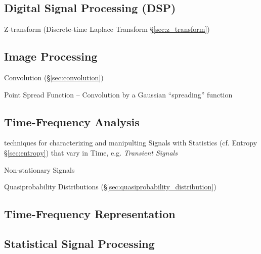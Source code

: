 \subsection{Digital Signal Processing (DSP)}\label{sec:dsp}

\fist Z-transform (Discrete-time Laplace Transform \S\ref{sec:z_transform})



\subsection{Image Processing}\label{sec:image_processing}

Convolution (\S\ref{sec:convolution})

Point Spread Function -- Convolution by a Gaussian ``spreading'' function



\subsection{Time-Frequency Analysis}\label{sec:time_frequency_analysis}

techniques for characterizing and manipulting Signals with Statistics (cf.
Entropy \S\ref{sec:entropy}) that vary in Time, e.g. \emph{Transient Signals}

Non-stationary Signals

\fist Quasiprobability Distributions
(\S\ref{sec:quasiprobability_distribution})



\subsection{Time-Frequency Representation}
\label{sec:time_frequency_representation}



\subsection{Statistical Signal Processing}\label{sec:statistical_signal}

